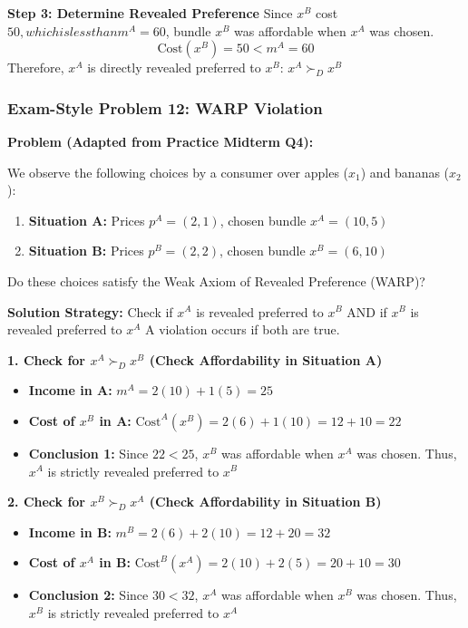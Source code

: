 \documentclass{article}
\begin{document}
\textbf{Step 3: Determine Revealed Preference}
Since $x^B$ cost $50, which is less than m^A=60$, bundle $x^B$ was affordable when $x^A$ was chosen.
\[\text{Cost}(x^B) = 50 < m^A = 60\]
Therefore, $x^A$ is directly revealed preferred to $x^B$: $x^A \succ_D x^B$

\hrulefill\vspace{2ex}

\subsubsection*{Exam-Style Problem 12: WARP Violation}

\textbf{Problem (Adapted from Practice Midterm Q4):}

We observe the following choices by a consumer over apples ($x_1$) and bananas ($x_2$):
\begin{enumerate}
    \item \textbf{Situation A:} Prices $p^A = (2, 1)$, chosen bundle $x^A = (10, 5)$
    \item \textbf{Situation B:} Prices $p^B = (2, 2)$, chosen bundle $x^B = (6, 10)$
\end{enumerate}

Do these choices satisfy the Weak Axiom of Revealed Preference (WARP)?

\textbf{Solution Strategy:} Check if $x^A$ is revealed preferred to $x^B$ AND if $x^B$ is revealed preferred to $x^A$ A violation occurs if both are true.

\textbf{1. Check for $x^A \succ_D x^B$ (Check Affordability in Situation A)}
\begin{itemize}
    \item \textbf{Income in A:} $m^A = 2(10) + 1(5) = 25$
    \item \textbf{Cost of $x^B$ in A:} $\text{Cost}^A(x^B) = 2(6) + 1(10) = 12 + 10 = 22$
    \item \textbf{Conclusion 1:} Since $22 < 25$, $x^B$ was affordable when $x^A$ was chosen. Thus, $x^A$ is strictly revealed preferred to $x^B$
\end{itemize}

\textbf{2. Check for $x^B \succ_D x^A$ (Check Affordability in Situation B)}
\begin{itemize}
    \item \textbf{Income in B:} $m^B = 2(6) + 2(10) = 12 + 20 = 32$
    \item \textbf{Cost of $x^A$ in B:} $\text{Cost}^B(x^A) = 2(10) + 2(5) = 20 + 10 = 30$
    \item \textbf{Conclusion 2:} Since $30 < 32$, $x^A$ was affordable when $x^B$ was chosen. Thus, $x^B$ is strictly revealed preferred to $x^A$
\end{itemize}
\end{document}
